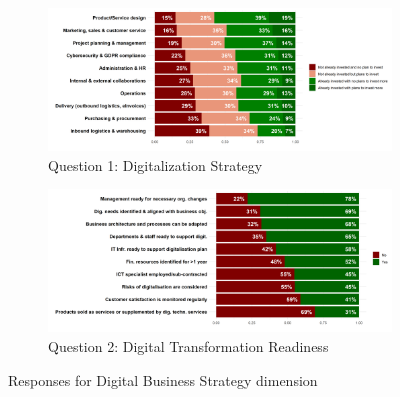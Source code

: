 \documentclass[12pt]{report}
\begin{document}

\begin{figure}
    \centering
    \begin{subfigure}[b]{0.8\textwidth}
        \centering
        \includegraphics[width=\linewidth]{../Output/q1collapsed.png}
        \caption{Question 1: Digitalization Strategy}
    \end{subfigure}
    \vfill
    \begin{subfigure}[b]{0.8\textwidth}
        \centering
        \includegraphics[width=\linewidth]{../Output/q2.png}
        \caption{Question 2: Digital Transformation Readiness}
    \end{subfigure}
    \caption{Responses for Digital Business Strategy dimension}
\end{figure}
\end{document}
